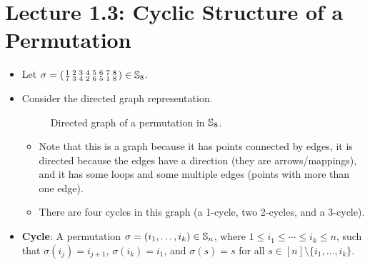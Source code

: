 \documentclass[../apprentice.tex]{subfiles}
\begin{document}
\section{Lecture 1.3: Cyclic Structure of a Permutation}
\begin{itemize}
    \item Let $
        \sigma=\left(
            \begin{smallmatrix}
                1 & 2 & 3 & 4 & 5 & 6 & 7 & 8\\
                7 & 3 & 4 & 2 & 6 & 5 & 1 & 8\\
            \end{smallmatrix}
        \right)\in\mathbb{S}_8
    $.
    \item Consider the directed graph representation.
    \begin{figure}[h!]
        \centering
        \caption{Directed graph of a permutation in $\mathbb{S}_8$.}
        \label{fig:directedGraphS8}
    \end{figure}
    \begin{itemize}
        \item Note that this is a graph because it has points connected by edges, it is directed because the edges have a direction (they are arrows/mappings), and it has some loops and some multiple edges (points with more than one edge).
        \item There are four cycles in this graph (a 1-cycle, two 2-cycles, and a 3-cycle).
    \end{itemize}
    \item \textbf{Cycle}: A permutation $\sigma=(i_1,\dots,i_k)\in\mathbb{S}_n$, where $1\leq i_1\leq\cdots\leq i_k\leq n$, such that $\sigma(i_j)=i_{j+1}$, $\sigma(i_k)=i_1$, and $\sigma(s)=s$ for all $s\in[n]\setminus\{i_1,\dots,i_k\}$.

\end{itemize}
\end{document}
